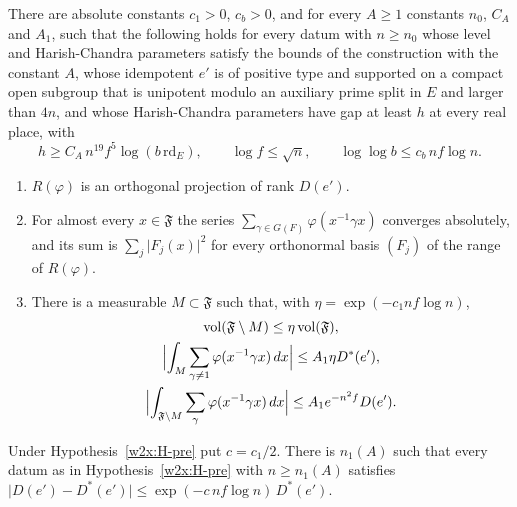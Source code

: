 \begin{hypothesis}\label{w2x:H-pre}
There are absolute constants $c_1>0$, $c_b>0$, and for every $A\ge1$ constants $n_0$, $C_A$ and $A_1$, such that the following holds for every datum with $n\ge n_0$ whose level and Harish-Chandra parameters satisfy the bounds of the construction with the constant $A$, whose idempotent $e'$ is of positive type and supported on a compact open subgroup that is unipotent modulo an auxiliary prime split in $E$ and larger than $4n$, and whose Harish-Chandra parameters have gap at least $h$ at every real place, with
\begin{equation}\label{w2x:gap}
h\ge C_A\,n^{19}f^5\log(b\,\mathrm{rd}_E),\qquad\log f\le\sqrt n,\qquad\log\log b\le c_b\,nf\log n.
\end{equation}
\begin{enumerate}[label=(\roman*),leftmargin=*]
\item $R(\varphi)$ is an orthogonal projection of rank $D(e')$.
\item For almost every $x\in\mathfrak F$ the series $\sum_{\gamma\in G(F)}\varphi(x^{-1}\gamma x)$ converges absolutely, and its sum is $\sum_j\lvert F_j(x)\rvert^2$ for every orthonormal basis $(F_j)$ of the range of $R(\varphi)$.
\item There is a measurable $M\subset\mathfrak F$ such that, with $\eta=\exp(-c_1nf\log n)$,
\[
\begin{gathered}
\operatorname{vol}(\mathfrak F\setminus M)\le\eta\operatorname{vol}(\mathfrak F),\\
\Bigl\lvert\int_M\sum_{\gamma\ne1}\varphi(x^{-1}\gamma x)\,dx\Bigr\rvert\le A_1\eta D^*(e'),\\
\Bigl\lvert\int_{\mathfrak F\setminus M}\sum_{\gamma}\varphi(x^{-1}\gamma x)\,dx\Bigr\rvert\le A_1e^{-n^2f}D(e').
\end{gathered}
\]
\end{enumerate}
\end{hypothesis}

\begin{theorem}\label{w2x:count}
Under Hypothesis~\ref{w2x:H-pre} put $c=c_1/2$. There is $n_1(A)$ such that every datum as in Hypothesis~\ref{w2x:H-pre} with $n\ge n_1(A)$ satisfies $\lvert D(e')-D^*(e')\rvert\le\exp(-c\,nf\log n)\,D^*(e')$.
\end{theorem}

